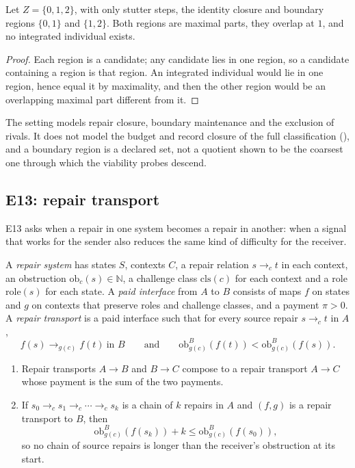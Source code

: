 \begin{proposition}\label{prop:e12-overlap}
Let $Z = \{0, 1, 2\}$, with only stutter steps, the identity closure and boundary regions $\{0, 1\}$
and $\{1, 2\}$. Both regions are maximal parts, they overlap at $1$, and no integrated individual
exists.
\end{proposition}

\begin{proof}
Each region is a candidate; any candidate lies in one region, so a candidate containing a region is
that region. An integrated individual would lie in one region, hence equal it by maximality, and
then the other region would be an overlapping maximal part different from it.
\end{proof}

The setting models repair closure, boundary maintenance and the exclusion of rivals. It does not
model the budget and record closure of the full classification (), and a boundary
region is a declared set, not a quotient shown to be the coarsest one through which the viability
probes descend.

\subsection{E13: repair transport}\label{sec:e13-semantic}

E13 asks when a repair in one system becomes a repair in another: when a signal that works for the
sender also reduces the same kind of difficulty for the receiver.

\begin{definition}\label{def:e13-transport}
A \emph{repair system} has states $S$, contexts $C$, a repair relation $s \to_c t$ in each context,
an obstruction $\mathrm{ob}_c(s) \in \mathbb N$, a challenge class $\mathrm{cls}(c)$ for each context
and a role $\mathrm{role}(s)$ for each state. A \emph{paid interface} from $A$ to $B$ consists of
maps $f$ on states and $g$ on contexts that preserve roles and challenge classes, and a payment
$\pi > 0$. A \emph{repair transport} is a paid interface such that for every source repair
$s \to_c t$ in $A$,
\[
  f(s) \to_{g(c)} f(t) \ \text{in } B
  \qquad\text{and}\qquad
  \mathrm{ob}^B_{g(c)}(f(t)) < \mathrm{ob}^B_{g(c)}(f(s)).
\]
\end{definition}

\begin{theorem}\label{thm:e13-chain}
\begin{enumerate}
  \item Repair transports $A \to B$ and $B \to C$ compose to a repair transport $A \to C$ whose
    payment is the sum of the two payments.
  \item If $s_0 \to_c s_1 \to_c \cdots \to_c s_k$ is a chain of $k$ repairs in $A$ and $(f, g)$ is a
    repair transport to $B$, then
    \[
      \mathrm{ob}^B_{g(c)}(f(s_k)) + k \le \mathrm{ob}^B_{g(c)}(f(s_0)),
    \]
    so no chain of source repairs is longer than the receiver's obstruction at its start.
\end{enumerate}
\end{theorem}

